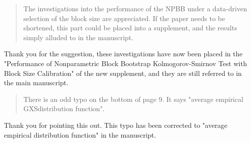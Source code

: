 \documentclass[12pt]{article}
\newenvironment{comment}%
{\begin{quotation}\noindent\small\it\color{darkblue}\ignorespaces%
}{\end{quotation}}
\begin{document}
\begin{comment}
The investigations into the performance of the NPBB under a data-driven selection of the block size are appreciated.  If the paper needs to be shortened, this part could be placed into a supplement, and the results simply alluded to in the manuscript.
\end{comment}

Thank you for the suggestion, these investigations have now been placed in the "Performance of Nonparametric
Block Bootstrap Kolmogorov-Smirnov Test with Block Size Calibration" of
the new supplement, and they are still referred to in
the main manuscript.

\begin{comment}
There is an odd typo on the bottom of page 9. It says "average empirical GXSdistribution function".
\end{comment}

Thank you for pointing this out. This typo has been
corrected to "average empirical distribution function" in the manuscript.





\end{document}
